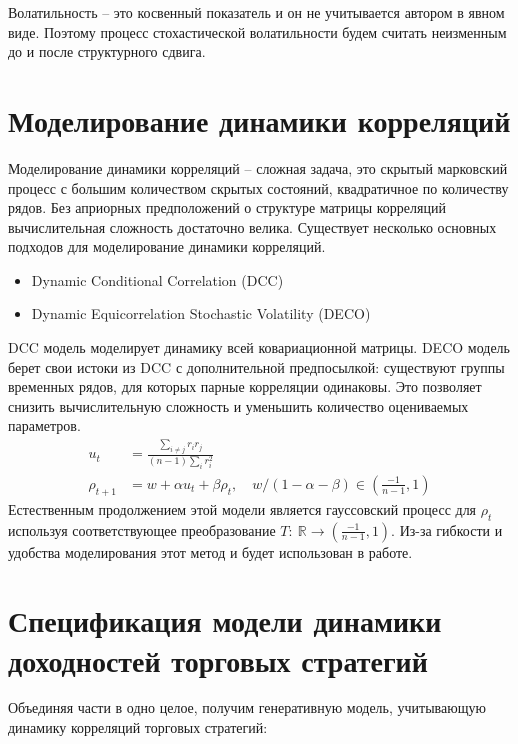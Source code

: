 Волатильность -- это косвенный показатель и он не учитывается автором в явном виде. Поэтому процесс стохастической волатильности будем считать неизменным до и после структурного сдвига.
\section{Моделирование динамики корреляций}
Моделирование динамики корреляций -- сложная задача, это скрытый марковский процесс с большим количеством скрытых состояний, квадратичное по количеству рядов. Без априорных предположений о структуре матрицы корреляций вычислительная сложность достаточно велика. Существует несколько основных подходов для моделирование динамики корреляций.
\begin{itemize}
	\item Dynamic Conditional Correlation (DCC) \citep{engle2000}
	\item Dynamic Equicorrelation Stochastic Volatility (DECO) \citep{kurose2016}
\end{itemize}
DCC модель моделирует динамику всей ковариационной матрицы. DECO модель берет свои истоки из DCC с дополнительной предпосылкой: существуют группы временных рядов, для которых парные корреляции одинаковы. Это позволяет снизить вычислительную сложность и уменьшить количество оцениваемых параметров.
\begin{align}
u_t &= \frac{\sum_{i\neq j} r_i r_j}{(n-1) \sum_{i} r_i^2}\\
\rho_{t+1} &= w + \alpha u_t + \beta \rho_t, \quad w/(1-\alpha-\beta) \in \left(\tfrac{-1}{n-1}, 1\right)
\end{align}
Естественным продолжением этой модели является гауссовский процесс для $\rho_t$ используя соответствующее преобразование $T:\: \mathbb{R} \to \left(\tfrac{-1}{n-1}, 1\right)$. Из-за гибкости и удобства моделирования этот метод и будет использован в работе.
\section{Спецификация модели динамики доходностей торговых стратегий}
Объединяя части в одно целое, получим генеративную модель, учитывающую динамику корреляций торговых стратегий:


